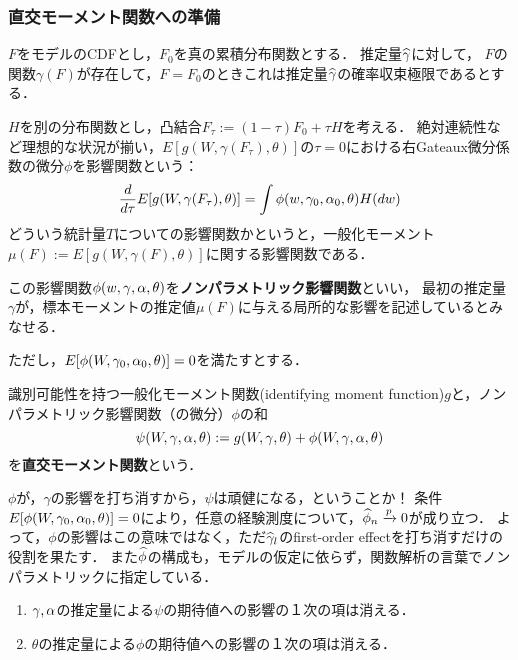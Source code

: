 \documentclass[uplatex,dvipdfmx]{jsreport}
\begin{document}
\subsubsection{直交モーメント関数への準備}

$F$をモデルのCDFとし，$F_0$を真の累積分布関数とする．
推定量$\widehat{\gamma}$に対して，
$F$の関数$\gamma(F)$が存在して，$F=F_0$のときこれは推定量$\widehat{\gamma}$の確率収束極限であるとする．

$H$を別の分布関数とし，凸結合$F_\tau:=(1-\tau)F_0+\tau H$を考える．
絶対連続性など理想的な状況が揃い，$E[g(W,\gamma(F_\tau),\theta)]$の$\tau=0$における右Gateaux微分係数の微分$\phi$を影響関数という：
\[\frac{d }{d \tau}E[g(W,\gamma(F_\tau),\theta)]=\int\phi(w,\gamma_0,\alpha_0,\theta)H(dw)\]
どういう統計量$T$についての影響関数かというと，一般化モーメント$\mu(F):=E[g(W,\gamma(F),\theta)]$に関する影響関数である．

この影響関数$\phi(w,\gamma,\alpha,\theta)$を\textbf{ノンパラメトリック影響関数}といい，
最初の推定量$\gamma$が，標本モーメントの推定値$\mu(F)$に与える局所的な影響を記述しているとみなせる．

ただし，$E[\phi(W,\gamma_0,\alpha_0,\theta)]=0$を満たすとする．

\begin{definition}
    識別可能性を持つ一般化モーメント関数(identifying moment function)$g$と，ノンパラメトリック影響関数（の微分）$\phi$の和
    \[\psi(W,\gamma,\alpha,\theta):=g(W,\gamma,\theta)+\phi(W,\gamma,\alpha,\theta)\]
    を\textbf{直交モーメント関数}という．
\end{definition}
\begin{remarks}
    $\phi$が，$\gamma$の影響を打ち消すから，$\psi$は頑健になる，ということか！
    条件$E[\phi(W,\gamma_0,\alpha_0,\theta)]=0$により，任意の経験測度について，$\widehat{\phi}_n\xrightarrow{p}0$が成り立つ．
    よって，$\phi$の影響はこの意味ではなく，ただ$\widehat{\gamma}_l$のfirst-order effectを打ち消すだけの役割を果たす．
    また$\widehat{\phi}$の構成も，モデルの仮定に依らず，関数解析の言葉でノンパラメトリックに指定している．
\end{remarks}

\begin{theorem}\mbox{}
    \begin{enumerate}
        \item $\gamma,\alpha$の推定量による$\psi$の期待値への影響の１次の項は消える．
        \item $\theta$の推定量による$\phi$の期待値への影響の１次の項は消える．
    \end{enumerate}
\end{theorem}
\end{document}
